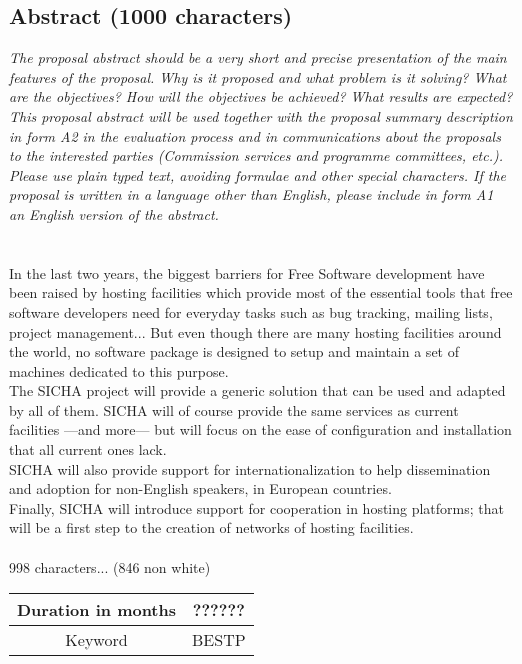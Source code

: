 \documentclass[a4paper,11pt]{report}
\begin{document}
\subsection*{Abstract (1000 characters)}
\textit{The proposal abstract should be a very short and precise presentation
of the main features of the proposal. Why is it proposed and what problem is it
solving? What are the objectives? How will the objectives be achieved? What
results are expected? This proposal abstract will be used together with the
proposal summary description in form A2 in the evaluation process and in
communications about the proposals to the interested parties (Commission
services and programme committees, etc.). Please use plain typed text, avoiding
formulae and other special characters. If the proposal is written in a language
other than English, please include in form A1 an English version of the
abstract.} \\ \\ \\
In the last two years, the biggest barriers for Free Software development have
been raised by hosting facilities which provide most of the essential tools
that free software developers need for everyday tasks such as bug tracking,
mailing lists, project management... But even though there are many hosting
facilities around the world, no software package is designed to setup and
maintain a set of machines dedicated to this purpose. \\ 
The SICHA project will provide a generic solution that can be used and adapted
by all of them. SICHA will of course provide the same services as current
facilities ---and more--- but will focus on the ease of configuration and
installation that all current ones lack. \\
SICHA will also provide support for internationalization to help dissemination
and adoption for non-English speakers, in European countries.\\
Finally, SICHA will introduce support for cooperation in hosting platforms;
that will be a first step to the creation of networks of hosting facilities. 
\\ \\ 
998 characters... (846 non white) \\
\begin{tabular}{|c|c|}
\hline
Duration in months & ?????? \\ \hline
Keyword & BESTP \\ \hline
\end{tabular}
\end{document}
